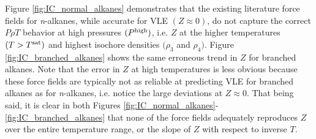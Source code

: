 \documentclass[preprint,letterpaper,floatfix,citeautoscript,aip,jcp]{revtex4-1}
\begin{document}
Figure \ref{fig:IC_normal_alkanes} demonstrates that the existing literature force fields for \textit{n}-alkanes, while accurate for VLE $(Z \approx 0)$, do not capture the correct $P \rho T$ behavior at high pressures $(P^{\rm high})$, i.e. $Z$ at the higher temperatures $(T > T^{\rm sat})$ and highest isochore densities $(\rho_3$ and $\rho_4)$. 
Figure \ref{fig:IC_branched_alkanes} shows the same erroneous trend in $Z$ for branched alkanes. Note that the error in $Z$ at high temperatures is less obvious because these force fields are typically not as reliable at predicting VLE for branched alkanes as for \textit{n}-alkanes, i.e. notice the large deviations at $Z \approx 0$. That being said, it is clear in both Figures \ref{fig:IC_normal_alkanes}-\ref{fig:IC_branched_alkanes} that none of the force fields adequately reproduces $Z$ over the entire temperature range, or the slope of $Z$ with respect to inverse $T$.



\end{document}
